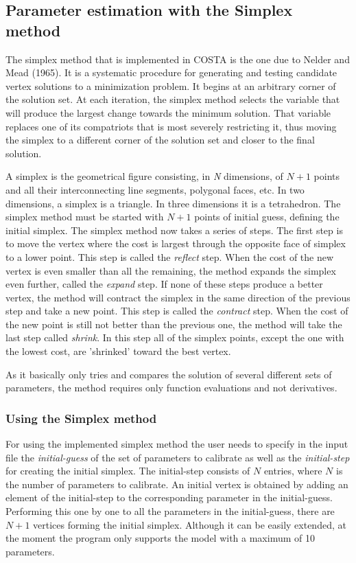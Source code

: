 \documentclass[a4paper,12pt]{article}
\begin{document}
\subsection{Parameter estimation with the Simplex method}
\label{sssec.simplex}
The simplex method that is implemented in COSTA is the one due to Nelder and
Mead (1965). It is a systematic procedure for generating and testing
candidate vertex solutions to a minimization problem. It begins at an
arbitrary corner of the solution set. At each iteration, the simplex method
selects the variable that will produce the largest change towards the
minimum solution. That variable replaces one of its compatriots that is
most severely restricting it, thus moving the simplex to a different corner
of the solution set and closer to the final solution.

A simplex is the geometrical figure consisting, in \emph{N} dimensions, of
$N+1$ points and all their interconnecting line segments, polygonal faces,
etc. In two dimensions, a simplex is a triangle. In three dimensions it is
a tetrahedron. The simplex method must be started with $N+1$ points of
initial guess, defining the initial simplex. The simplex method now takes a
series of steps. The first step is to move the vertex where the cost is
largest through the opposite face of simplex to a lower point. This step is
called the \emph{reflect} step. When the cost of the new vertex is even
smaller than all the remaining, the method expands the simplex even
further, called the \emph{expand} step. If none of these steps produce a 
better vertex, the method will contract the simplex in the same direction
of the previous step and take a new point. This step is called the
\emph{contract} step. When the cost of the new point is still not better
than the previous one, the method will take the last step called
\emph{shrink}. In this step all of the simplex points, except the one with
the lowest cost, are 'shrinked' toward the best vertex.

As it basically only tries and compares the solution of several different
sets of parameters, the method requires only function evaluations and not
derivatives.

\subsubsection{Using the Simplex method}
For using the implemented simplex method the user needs to specify in the
input file the \emph{initial-guess} of the set of parameters to calibrate
as well as the \emph{initial-step} for creating the initial simplex. The
initial-step consists of $N$ entries, where $N$ is the number of parameters
to calibrate. An initial vertex is obtained by adding an element of the
initial-step to the corresponding parameter in the initial-guess.
Performing this one by one to all the parameters in the initial-guess,
there are $N+1$ vertices forming the initial simplex. Although it can be
easily extended, at the moment the program only supports the model with
a maximum of 10 parameters.
\end{document}

